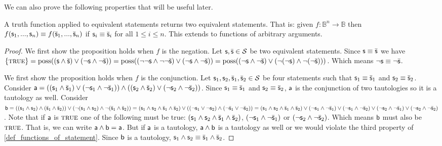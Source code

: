 \documentclass[11pt,letterpaper,fleqn]{memoir} %
\begin{document}
We can also prove the following properties that will be useful later.


\begin{mathSection}
	
	\begin{prop}
		A truth function applied to equivalent statements returns two equivalent statements. That is: given $f : \mathbb{B}^n \to \mathbb{B}$ then $f(\stmt_1, ..., \stmt_n) \equiv f(\bar{\stmt}_1, ..., \bar{\stmt}_n)$ if $\stmt_i \equiv \bar{\stmt}_i$ for all $1 \leq i \leq n$. This extends to functions of arbitrary arguments.
	\end{prop}
	\begin{proof}
		We first show the proposition holds when $f$ is the negation. Let $\stmt, \bar{\stmt} \in \mathcal{S}$ be two equivalent statements. Since $\stmt \equiv \bar{\stmt}$ we have $\{\TRUE\} = \poss((\stmt \AND \bar{\stmt}) \OR (\NOT \stmt \AND \NOT \bar{\stmt})) = \poss((\NOT \NOT \stmt \AND \NOT \NOT \bar{\stmt}) \OR (\NOT \stmt \AND \NOT \bar{\stmt})) = \poss((\NOT \stmt \AND \NOT \bar{\stmt}) \OR (\NOT (\NOT \stmt) \AND \NOT (\NOT \bar{\stmt})))$. Which means  $\NOT \stmt \equiv \NOT \bar{\stmt}$.
		
		We first show the proposition holds when $f$ is the conjunction. Let $\stmt_1, \stmt_2, \bar{\stmt}_1, \bar{\stmt}_2 \in \mathcal{S}$ be four statements such that $\stmt_1 \equiv \bar{\stmt}_1$ and $\stmt_2 \equiv \bar{\stmt}_2$. Consider $\stmt[a] = ((\stmt_1 \AND \bar{\stmt}_1) \OR (\NOT \stmt_1 \AND \NOT \bar{\stmt}_1)) \AND ((\stmt_2 \AND \bar{\stmt}_2) \OR (\NOT \stmt_2 \AND \NOT \bar{\stmt}_2))$. Since $\stmt_1 \equiv \bar{\stmt}_1$ and $\stmt_2 \equiv \bar{\stmt}_2$, $\stmt[a]$ is the conjunction of two tautologies so it is a tautology as well. Consider $\stmt[b] = ((\stmt_1 \AND \stmt_2) \AND (\bar{\stmt}_1 \AND \bar{\stmt}_2)) \OR  (\NOT (\stmt_1 \AND \stmt_2) \AND \NOT (\bar{\stmt}_1 \AND \bar{\stmt}_2))= 	
		(\stmt_1 \AND \stmt_2 \AND \bar{\stmt}_1 \AND \bar{\stmt}_2) \OR ((\NOT \stmt_1 \OR \NOT \stmt_2) \AND (\NOT \bar{\stmt}_1 \OR \NOT \bar{\stmt}_2)) = (\stmt_1 \AND \stmt_2 \AND \bar{\stmt}_1 \AND \bar{\stmt}_2) \OR (\NOT \stmt_1 \AND \NOT \bar{\stmt}_1) \OR (\NOT \stmt_1 \AND \NOT \bar{\stmt}_2) \OR (\NOT \stmt_2 \AND \NOT \bar{\stmt}_1) \OR (\NOT \stmt_2 \AND \NOT \bar{\stmt}_2)$. Note that if $\stmt[a]$ is $\TRUE$ one of the following must be true: $(\stmt_1 \AND \stmt_2 \AND \bar{\stmt}_1 \AND \bar{\stmt}_2)$, $(\NOT \stmt_1 \AND \NOT \bar{\stmt}_1)$ or $(\NOT \stmt_2 \AND \NOT \bar{\stmt}_2)$. Which means $\stmt[b]$ must also be $\TRUE$. That is, we can write $\stmt[a] \AND \stmt[b] = \stmt[a]$. But if $\stmt[a]$ is a tautology, $\stmt[a] \AND \stmt[b]$ is a tautology as well or we would violate the third property of \ref{def_functions_of_statement}. Since $\stmt[b]$ is a tautology, $\stmt_1 \AND \stmt_2 \equiv \bar{\stmt}_1 \AND \bar{\stmt}_2$.
		

\end{proof}
\end{mathSection}
\end{document}
